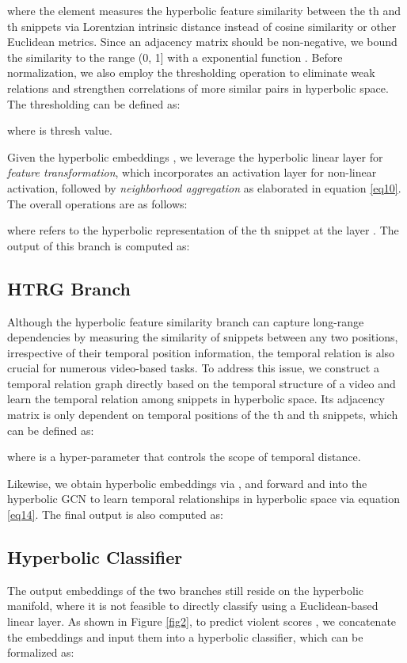 \documentclass[sigconf]{acmart}
\begin{document}
where the element  measures the hyperbolic feature similarity between the th and th snippets via Lorentzian intrinsic distance  instead of cosine similarity or other Euclidean metrics. Since an adjacency matrix should be non-negative, we bound the similarity to the range (0, 1] with a exponential function . Before  normalization, we also employ the thresholding operation to eliminate weak relations and strengthen correlations of more similar pairs in hyperbolic space. The thresholding can be defined as:

where  is thresh value.

Given the hyperbolic embeddings , we leverage the hyperbolic linear layer  for \emph{feature transformation}, which incorporates an activation layer for non-linear activation, followed by \emph{neighborhood aggregation}  as elaborated in equation \ref{eq10}. The overall operations are as follows: 

where  refers to the hyperbolic representation of the th snippet at the layer . The output of this branch is computed as:






\subsection{HTRG Branch}
Although the hyperbolic feature similarity branch can capture long-range dependencies by measuring the similarity of snippets between any two positions, irrespective of their temporal position information, the temporal relation is also crucial for numerous video-based tasks. To address this issue, we construct a temporal relation graph directly based on the temporal structure of a video and learn the temporal relation among snippets in hyperbolic space. Its adjacency matrix is only dependent on temporal positions of the th and th snippets, which can be defined as:

where  is a hyper-parameter that controls the scope of temporal distance.

Likewise, we obtain hyperbolic embeddings via , and forward  and  into the hyperbolic GCN to learn temporal relationships in hyperbolic space via equation \ref{eq14}. The final output is also computed as:





\subsection{Hyperbolic Classifier}
The output embeddings of the two branches still reside on the hyperbolic manifold, where it is not feasible to directly classify using a Euclidean-based linear layer. As shown in Figure \ref{fig2}, to predict violent scores , we concatenate the embeddings and input them into a hyperbolic classifier, which can be formalized as:
\end{document}
